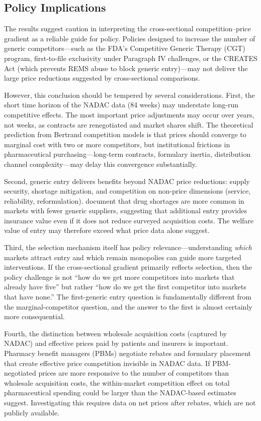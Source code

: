 \documentclass[12pt]{article}
\begin{document}
\subsection{Policy Implications}

The results suggest caution in interpreting the cross-sectional competition--price gradient as a reliable guide for policy. Policies designed to increase the number of generic competitors---such as the FDA's Competitive Generic Therapy (CGT) program, first-to-file exclusivity under Paragraph IV challenges, or the CREATES Act (which prevents REMS abuse to block generic entry)---may not deliver the large price reductions suggested by cross-sectional comparisons.

However, this conclusion should be tempered by several considerations. First, the short time horizon of the NADAC data (84 weeks) may understate long-run competitive effects. The most important price adjustments may occur over years, not weeks, as contracts are renegotiated and market shares shift. The theoretical prediction from Bertrand competition models is that prices should converge to marginal cost with two or more competitors, but institutional frictions in pharmaceutical purchasing---long-term contracts, formulary inertia, distribution channel complexity---may delay this convergence substantially.

Second, generic entry delivers benefits beyond NADAC price reductions: supply security, shortage mitigation, and competition on non-price dimensions (service, reliability, reformulation). \citet{Yurukoglu2017} document that drug shortages are more common in markets with fewer generic suppliers, suggesting that additional entry provides insurance value even if it does not reduce surveyed acquisition costs. The welfare value of entry may therefore exceed what price data alone suggest.

Third, the selection mechanism itself has policy relevance---understanding \emph{which} markets attract entry and which remain monopolies can guide more targeted interventions. If the cross-sectional gradient primarily reflects selection, then the policy challenge is not ``how do we get more competitors into markets that already have five'' but rather ``how do we get the first competitor into markets that have none.'' The first-generic entry question is fundamentally different from the marginal-competitor question, and the answer to the first is almost certainly more consequential.

Fourth, the distinction between wholesale acquisition costs (captured by NADAC) and effective prices paid by patients and insurers is important. Pharmacy benefit managers (PBMs) negotiate rebates and formulary placement that create effective price competition invisible in NADAC data. If PBM-negotiated prices are more responsive to the number of competitors than wholesale acquisition costs, the within-market competition effect on total pharmaceutical spending could be larger than the NADAC-based estimates suggest. Investigating this requires data on net prices after rebates, which are not publicly available.
\end{document}
